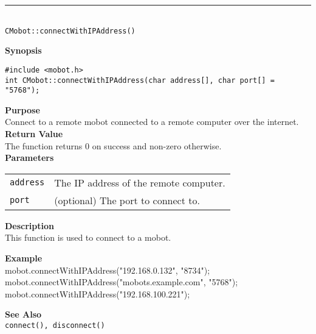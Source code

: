 \noindent
\vspace{5pt}
\rule{4.5in}{0.015in} \\
\noindent
{\LARGE \texttt{CMobot::connectWithIPAddress()}}\\
{}

\noindent
{\bf Synopsis}
\vspace{-8pt}
\begin{verbatim}
#include <mobot.h>
int CMobot::connectWithIPAddress(char address[], char port[] = "5768");
\end{verbatim}

\noindent
{\bf Purpose}\\
Connect to a remote mobot connected to a remote computer over the internet.\\

\noindent
{\bf Return Value}\\
The function returns 0 on success and non-zero otherwise.\\

\noindent
{\bf Parameters}
\vspace{-0.1in}
\begin{description}
\item               
\begin{tabular}{p{10 mm}p{145 mm}}
\texttt{address} & The IP address of the remote computer. \\
\texttt{port} & (optional) The port to connect to. \\
\end{tabular}
\end{description}

\noindent
{\bf Description}\\
This function is used to connect to a mobot. 

\noindent
{\bf Example}\\
mobot.connectWithIPAddress("192.168.0.132", "8734");
mobot.connectWithIPAddress("mobots.example.com", "5768");
mobot.connectWithIPAddress("192.168.100.221");
\noindent

\noindent
{\bf See Also}\\
\texttt{connect(), disconnect()}

